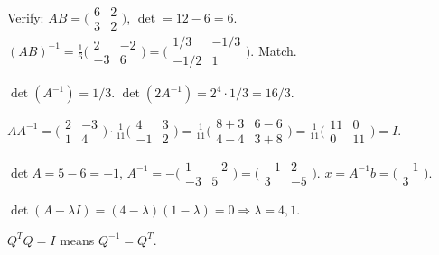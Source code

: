 \begin{solutions}
\[    \]
    Verify: $A B = \bigl(\begin{smallmatrix} 6 & 2 \\ 3 & 2 \end{smallmatrix}\bigr)$, $\det = 12 - 6 = 6$. $(A B)^{-1} = \tfrac{1}{6}\bigl(\begin{smallmatrix} 2 & -2 \\ -3 & 6 \end{smallmatrix}\bigr) = \bigl(\begin{smallmatrix} 1/3 & -1/3 \\ -1/2 & 1 \end{smallmatrix}\bigr)$. Match.
    \item $\det(A^{-1}) = 1/3$. $\det(2 A^{-1}) = 2^{4} \cdot 1/3 = 16/3$.
    \item $A A^{-1} = \bigl(\begin{smallmatrix} 2 & -3 \\ 1 & 4 \end{smallmatrix}\bigr) \cdot \tfrac{1}{11}\bigl(\begin{smallmatrix} 4 & 3 \\ -1 & 2 \end{smallmatrix}\bigr) = \tfrac{1}{11}\bigl(\begin{smallmatrix} 8 + 3 & 6 - 6 \\ 4 - 4 & 3 + 8 \end{smallmatrix}\bigr) = \tfrac{1}{11}\bigl(\begin{smallmatrix} 11 & 0 \\ 0 & 11 \end{smallmatrix}\bigr) = I$.
    \item $\det A = 5 - 6 = -1$, $A^{-1} = -\bigl(\begin{smallmatrix} 1 & -2 \\ -3 & 5 \end{smallmatrix}\bigr) = \bigl(\begin{smallmatrix} -1 & 2 \\ 3 & -5 \end{smallmatrix}\bigr)$. $x = A^{-1} b = \bigl(\begin{smallmatrix} -1 \\ 3 \end{smallmatrix}\bigr)$.
    \item $\det(A - \lambda I) = (4 - \lambda)(1 - \lambda) = 0 \Rightarrow \lambda = 4, 1$.
    \item $Q^{T} Q = I$ means $Q^{-1} = Q^{T}$.

\end{solutions}
